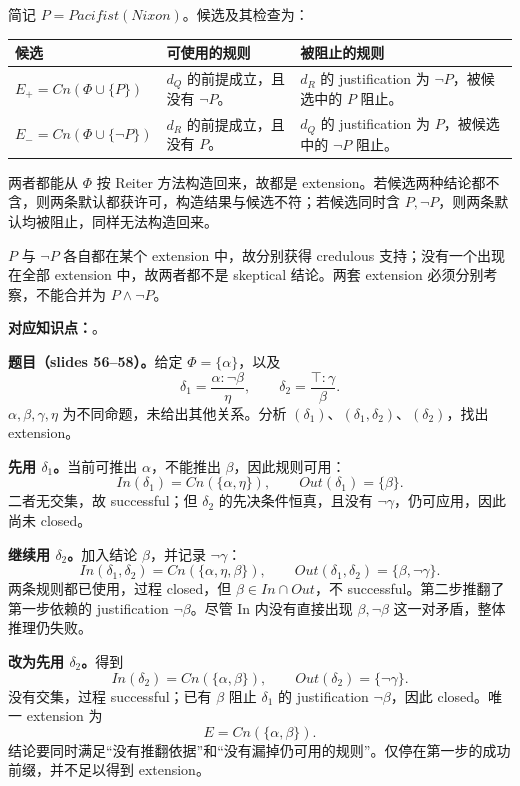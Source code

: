 \begin{workedsolution}
简记 $P=Pacifist(Nixon)$。候选及其检查为：
\begin{center}
\small
\begin{tabularx}{\textwidth}{@{}lXX@{}}
\toprule
候选 & 可使用的规则 & 被阻止的规则 \\
\midrule
$E_+=Cn(\Phi\cup\{P\})$ & $d_Q$ 的前提成立，且没有 $\neg P$。 & $d_R$ 的 justification 为 $\neg P$，被候选中的 $P$ 阻止。\\
$E_-=Cn(\Phi\cup\{\neg P\})$ & $d_R$ 的前提成立，且没有 $P$。 & $d_Q$ 的 justification 为 $P$，被候选中的 $\neg P$ 阻止。\\
\bottomrule
\end{tabularx}
\end{center}
两者都能从 $\Phi$ 按 Reiter 方法构造回来，故都是 extension。若候选两种结论都不含，则两条默认都获许可，构造结果与候选不符；若候选同时含 $P,\neg P$，则两条默认均被阻止，同样无法构造回来。

$P$ 与 $\neg P$ 各自都在某个 extension 中，故分别获得 credulous 支持；没有一个出现在全部 extension 中，故两者都不是 skeptical 结论。两套 extension 必须分别考察，不能合并为 $P\land\neg P$。
\end{workedsolution}


\textbf{对应知识点：}。

\textbf{题目（slides 56--58）。}给定 $\Phi=\{\alpha\}$，以及
\[
 \delta_1=\frac{\alpha:\neg\beta}{\eta},\qquad
 \delta_2=\frac{\top:\gamma}{\beta}.
\]
$\alpha,\beta,\gamma,\eta$ 为不同命题，未给出其他关系。分析 $(\delta_1)$、$(\delta_1,\delta_2)$、$(\delta_2)$，找出 extension。

\begin{workedsolution}
\textbf{先用 $\delta_1$。}当前可推出 $\alpha$，不能推出 $\beta$，因此规则可用：
\[
 In(\delta_1)=Cn(\{\alpha,\eta\}),\qquad Out(\delta_1)=\{\beta\}.
\]
二者无交集，故 successful；但 $\delta_2$ 的先决条件恒真，且没有 $\neg\gamma$，仍可应用，因此尚未 closed。

\textbf{继续用 $\delta_2$。}加入结论 $\beta$，并记录 $\neg\gamma$：
\[
 In(\delta_1,\delta_2)=Cn(\{\alpha,\eta,\beta\}),\qquad
 Out(\delta_1,\delta_2)=\{\beta,\neg\gamma\}.
\]
两条规则都已使用，过程 closed，但 $\beta\in In\cap Out$，不 successful。第二步推翻了第一步依赖的 justification $\neg\beta$。尽管 In 内没有直接出现 $\beta,\neg\beta$ 这一对矛盾，整体推理仍失败。

\textbf{改为先用 $\delta_2$。}得到
\[
 In(\delta_2)=Cn(\{\alpha,\beta\}),\qquad Out(\delta_2)=\{\neg\gamma\}.
\]
没有交集，过程 successful；已有 $\beta$ 阻止 $\delta_1$ 的 justification $\neg\beta$，因此 closed。唯一 extension 为
\[
 \boxed{E=Cn(\{\alpha,\beta\})}.
\]
结论要同时满足“没有推翻依据”和“没有漏掉仍可用的规则”。仅停在第一步的成功前缀，并不足以得到 extension。
\end{workedsolution}

